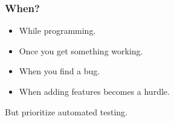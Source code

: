 \begin{frame}

\frametitle{When?}

\begin{itemize}

\item While programming.

\item Once you get something working.

\item When you find a bug.

\item When adding features becomes a hurdle.

\end{itemize}

\vspace{\fill}

\begin{center}

But prioritize automated testing.

\end{center}

\end{frame}
